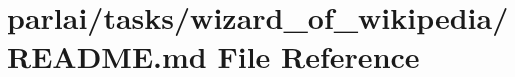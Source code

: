 \hypertarget{parlai_2tasks_2wizard__of__wikipedia_2README_8md}{}\section{parlai/tasks/wizard\+\_\+of\+\_\+wikipedia/\+R\+E\+A\+D\+ME.md File Reference}
\label{parlai_2tasks_2wizard__of__wikipedia_2README_8md}
